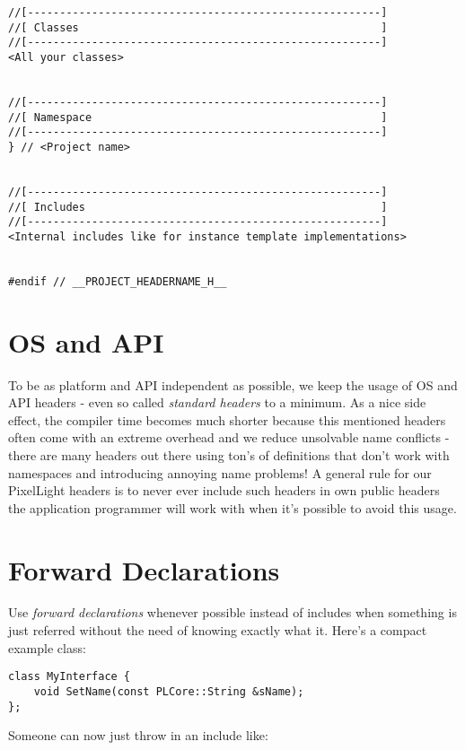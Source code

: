 \begin{lstlisting}[caption=Complete header layout]
//[-------------------------------------------------------]
//[ Classes                                               ]
//[-------------------------------------------------------]
<All your classes>


//[-------------------------------------------------------]
//[ Namespace                                             ]
//[-------------------------------------------------------]
} // <Project name>


//[-------------------------------------------------------]
//[ Includes                                              ]
//[-------------------------------------------------------]
<Internal includes like for instance template implementations>


#endif // __PROJECT_HEADERNAME_H__
\end{lstlisting}




\section{OS and API}
To be as platform and API independent as possible, we keep the usage of OS and API headers - even so called \emph{standard headers} to a minimum. As a nice side effect, the compiler time becomes much shorter because this mentioned headers often come with an extreme overhead and we reduce unsolvable name conflicts - there are many headers out there using ton's of definitions that don't work with namespaces and introducing annoying name problems! A general rule for our PixelLight headers is to never ever include such headers in own public headers the application programmer will work with when it's possible to avoid this usage.




\section{Forward Declarations}
Use \emph{forward declarations} whenever possible instead of includes when something is just referred without the need of knowing exactly what it. Here's a compact example class:

\begin{lstlisting}[caption=Using forward declaration]
class MyInterface {
	void SetName(const PLCore::String &sName);
};
\end{lstlisting}

Someone can now just throw in an include like:


